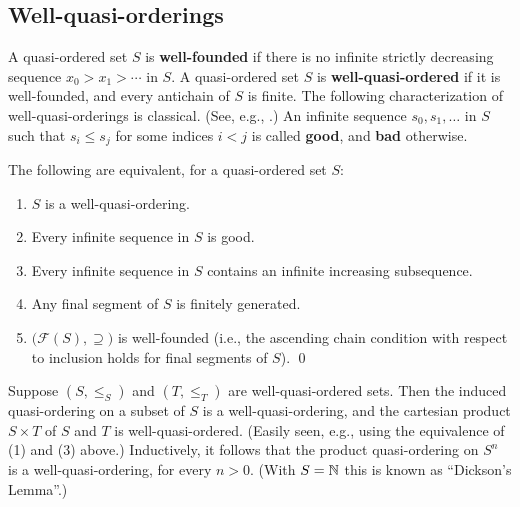 \subsection*{Well-quasi-orderings}
A quasi-ordered set $S$ is {\bf well-founded} if 
there is no
infinite strictly decreasing sequence $x_0 > x_1 > \cdots $ in $S$. 
A quasi-ordered set $S$ is {\bf well-quasi-ordered}
if it is well-founded, and every antichain of $S$ is finite.
The following characterization of well-quasi-orderings is classical.
(See, e.g., \cite{Kruskal}.) An infinite sequence 
$s_0,s_1,\dots$
in $S$ such that $s_i\leq s_j$ for some indices $i<j$
is called {\bf good}, and {\bf bad} otherwise.

\begin{prop}
The following are equivalent, for a quasi-ordered set $S$:
\begin{enumerate}
\item $S$ is a well-quasi-ordering.
\item Every infinite sequence in $S$ is good. 
\item Every infinite sequence in $S$ contains an infinite increasing
subsequence.
\item Any final segment of $S$ is finitely generated.
\item $\bigl(\mathcal{F} ( S ),\supseteq\bigr)$ is well-founded \textup{(}i.e., the ascending chain
condition with respect to inclusion holds for final segments of $S$\textup{).} \qed
\end{enumerate}
\end{prop}

Suppose $(S,{\leq}_S)$ and
$(T,{\leq}_T)$ are well-quasi-ordered sets. Then
the induced quasi-ordering on a subset of $S$ is a
well-quasi-ordering, and 
the cartesian product $S\times T$ of $S$ and $T$ is well-quasi-ordered.
(Easily seen, e.g., using the equivalence of (1) and (3) above.)
Inductively, it follows that the product quasi-ordering on
$S^n$ is a well-quasi-ordering, for
every $n>0$. (With $S={\mathbb N}$ this is known as ``Dickson's Lemma''.)

 